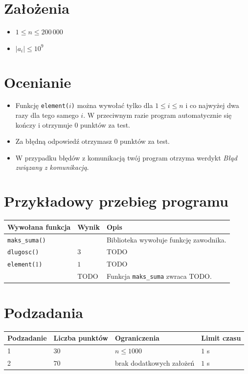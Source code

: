 \documentclass[zad,zawodnik,utf8,pl]{sinol}
\begin{document}
\begin{tasktext}
	\section{Założenia}
	\begin{itemize}
		\item $1 \leq n \leq 200\,000$
		\item $|a_i| \leq 10^9$
	\end{itemize}

	\section{Ocenianie}
	\begin{itemize}
		\item Funkcję \texttt{element($i$)} można wywołać tylko dla $1 \leq i \leq n$ i co najwyżej dwa razy dla tego samego $i$. W przeciwnym razie program automatycznie się kończy i otrzymuje $0$ punktów za test.
		\item Za błędną odpowiedź otrzymasz $0$ punktów za test.
		\item W przypadku błędów z komunikacją twój program otrzyma werdykt \textit{Błąd związany z komunikacją}.
	\end{itemize}

	\section{Przykładowy przebieg programu}

	\begin{center}
		\begin{tabular}{|l|l|p{10cm}|}
			\hline
			\textbf{Wywołana funkcja} & \textbf{Wynik}  & \textbf{Opis} \\ \hline
			\texttt{maks\_suma()}   &         & Biblioteka wywołuje funkcję zawodnika. \\ \hline
			\texttt{dlugosc()}      & $3$     & TODO \\ \hline
			\texttt{element($1$)}   & $1$     & TODO \\ \hline
			                        & TODO    & Funkcja \texttt{maks\_suma} zwraca TODO. \\ \hline
		\end{tabular}
	\end{center}

	\section{Podzadania}
	\begin{center}
		\begin{tabular}{|l|l|p{7cm}|l|}
			\hline
			\textbf{Podzadanie} & \textbf{Liczba punktów} & \textbf{Ograniczenia} & \textbf{Limit czasu} \\ \hline
			1 & $30$ & $n \leq 1000$ & $1$ s \\ \hline
			2 & $70$ & brak dodatkowych założeń & $1$ s \\ \hline
		\end{tabular}
	\end{center}


\end{tasktext}
\end{document}
